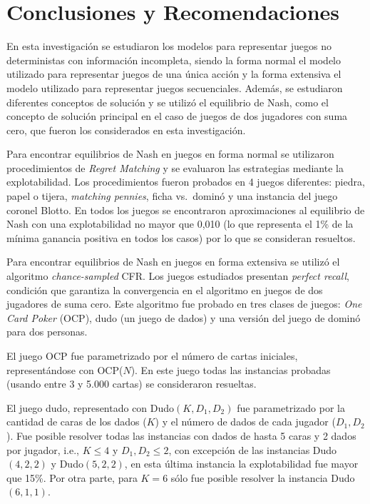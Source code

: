 \chapter*{Conclusiones y Recomendaciones}

En esta investigación se estudiaron los modelos para representar juegos no deterministas con información incompleta, siendo la forma normal el modelo utilizado para representar juegos de una única acción y la forma extensiva el modelo utilizado para representar juegos secuenciales. Además, se estudiaron diferentes conceptos de solución y se utilizó el equilibrio de Nash, como el concepto de solución principal en el caso de juegos de dos jugadores con suma cero, que fueron los considerados en esta investigación.

Para encontrar equilibrios de Nash en juegos en forma normal se utilizaron procedimientos de \textit{Regret Matching} y se evaluaron las estrategias mediante la explotabilidad. Los procedimientos fueron probados en 4 juegos diferentes: piedra, papel o tijera, \textit{matching pennies}, ficha vs.\ dominó y una instancia del juego coronel Blotto. En todos los juegos se encontraron aproximaciones al equilibrio de Nash con una explotabilidad no mayor que 0,010 (lo que representa el  1\% de la mínima ganancia positiva en todos los casos) por lo que se consideran resueltos.

Para encontrar equilibrios de Nash en juegos en forma extensiva se utilizó el algoritmo \textit{chance-sampled} CFR. Los juegos estudiados presentan \textit{perfect recall}, condición que garantiza la convergencia en el algoritmo en juegos de dos jugadores de suma cero. Este algoritmo fue probado en tres clases de juegos: \textit{One Card Poker} (OCP), dudo (un juego de dados) y una versión del juego de dominó para dos personas.

El juego OCP fue parametrizado por el número de cartas iniciales, representándose con OCP($N$). En este juego todas las instancias probadas (usando entre 3 y 5.000 cartas) se consideraron resueltas.

El juego dudo, representado con Dudo$(K, D_1, D_2)$ fue parametrizado por la cantidad de caras de los dados ($K$) y el número de dados de cada jugador ($D_1, D_2$). Fue posible resolver todas las instancias con dados de hasta 5 caras y 2 dados por jugador, i.e., $K \leq 4$ y $D_1, D_2 \leq 2$, con excepción de las instancias  Dudo$(4, 2, 2)$ y Dudo$(5, 2, 2)$, en esta última instancia la explotabilidad fue mayor que 15\%. Por otra parte, para $K = 6$ sólo fue posible resolver la instancia Dudo$(6, 1, 1)$.

